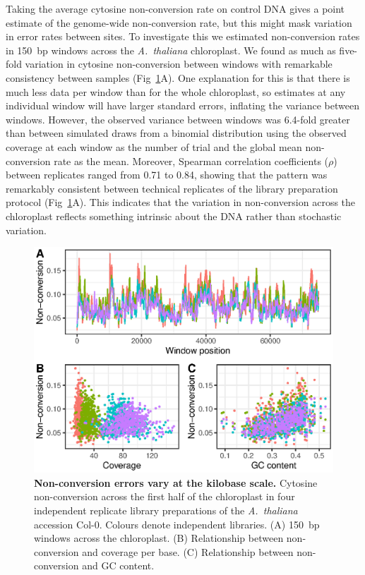 \documentclass[10pt,letterpaper]{article}
\begin{document}
Taking the average cytosine non-conversion rate on control DNA gives a point estimate of the genome-wide non-conversion rate, but this might mask variation in error rates between sites.
To investigate this we estimated non-conversion rates in 150~bp windows across the \emph{A.~thaliana} chloroplast.
We found as much as five-fold variation in cytosine non-conversion between windows with remarkable consistency between samples (Fig~\ref{fig:uncertainty}A).
One explanation for this is that there is much less data per window than for the whole chloroplast, so estimates at any individual window will have larger standard errors, inflating the variance between windows.
However, the observed variance between windows was 6.4-fold greater than between simulated draws from a binomial distribution using the observed coverage at each window as the number of trial and the global mean non-conversion rate as the mean.
Moreover, Spearman correlation coefficients ($\rho$) between replicates ranged from 0.71 to 0.84, showing that the pattern was remarkably consistent between technical replicates of the library preparation protocol (Fig~\ref{fig:uncertainty}A).
This indicates that the variation in non-conversion across the chloroplast reflects something intrinsic about the DNA rather than stochastic variation.

\begin{figure}
  \begin{center}
    \includegraphics{figure2.eps}
    \caption{
        {\bf Non-conversion errors vary at the kilobase scale.}
        Cytosine non-conversion across the first half of the chloroplast in four independent replicate library preparations of the \emph{A.~thaliana} accession Col-0.
        Colours denote independent libraries.
        (A) 150~bp windows across the chloroplast.
        (B) Relationship between non-conversion and coverage per base.
        (C) Relationship between non-conversion and GC content.
    }
    \label{fig:uncertainty}
  \end{center}
\end{figure}
\end{document}
